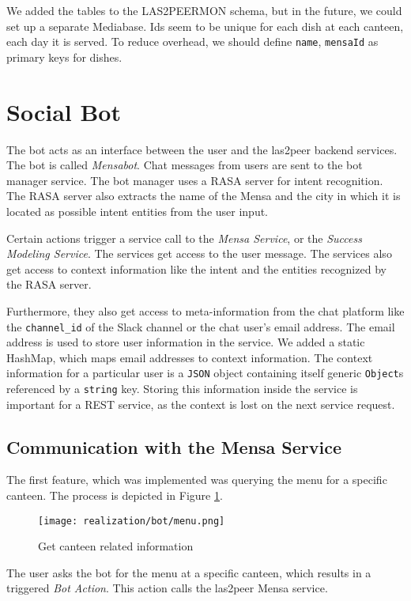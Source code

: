 We added the tables to the LAS2PEERMON schema, but in the future, we could set up a separate Mediabase.
Ids seem to be unique for each dish at each canteen, each day it is served. To reduce overhead, we should define \texttt{name}, \texttt{mensaId} as primary keys for dishes.


\section{Social Bot}
The bot acts as an interface between the user and the las2peer backend services. The bot is called \emph{Mensabot}.
Chat messages from users are sent to the bot manager service. 
The bot manager uses a RASA server for intent recognition. 
The RASA server also extracts the name of the Mensa and the city in which it is located as possible intent entities from the user input.

Certain actions trigger a service call to the \emph{Mensa Service}, or the \emph{Success Modeling Service}.
The services get access to the user message.  
The services also get access to context information like the intent and the entities recognized by the RASA server.

Furthermore, they also get access to meta-information from the chat platform like the \texttt{channel\_id} of the Slack channel or the chat user's email address. 
The email address is used to store user information in the service. We added a static HashMap, which maps email addresses to context information. The context information for a particular user is a \texttt{JSON} object containing itself generic \texttt{Object}s referenced by a \texttt{string} key. 
Storing this information inside the service is important for a REST service, as the context is lost on the next service request.

\subsection{Communication with the Mensa Service}
The first feature, which was implemented was querying the menu for a specific canteen. 
The process is depicted in Figure \ref{fig:getMenu}.
\begin{figure}[h]
    \centering
    \texttt{[image: realization/bot/menu.png]}
    \caption{Get canteen related information}
    \label{fig:getMenu}
\end{figure}
The user asks the bot for the menu at a specific canteen, which results in a triggered \emph{Bot Action}. This action calls the las2peer Mensa service. 

